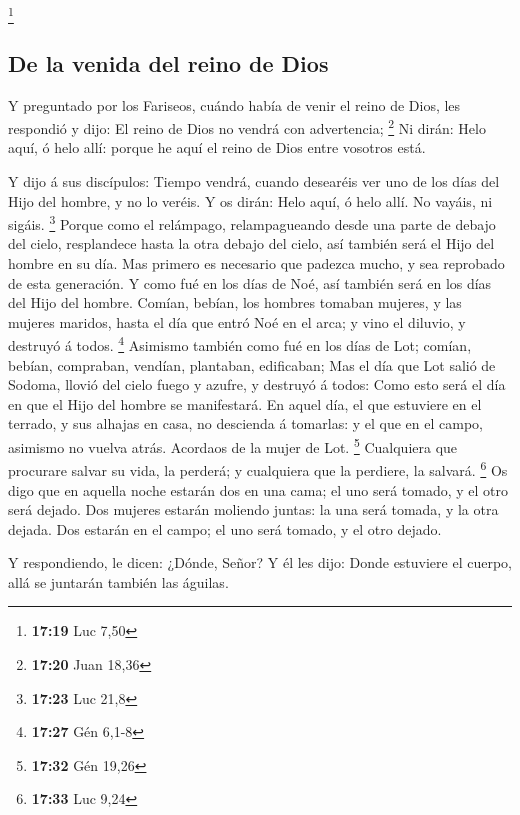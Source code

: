 \footnote{\textbf{17:19} Luc 7,50}

\hypertarget{de-la-venida-del-reino-de-dios}{%
\subsection{De la venida del reino de
Dios}\label{de-la-venida-del-reino-de-dios}}

 Y preguntado por los Fariseos, cuándo había de venir el
reino de Dios, les respondió y dijo: El reino de Dios no vendrá con
advertencia; \footnote{\textbf{17:20} Juan 18,36}  Ni
dirán: Helo aquí, ó helo allí: porque he aquí el reino de Dios entre
vosotros está.

 Y dijo á sus discípulos: Tiempo vendrá, cuando desearéis
ver uno de los días del Hijo del hombre, y no lo veréis. 
Y os dirán: Helo aquí, ó helo allí. No vayáis, ni sigáis. \footnote{\textbf{17:23}
  Luc 21,8}  Porque como el relámpago, relampagueando
desde una parte de debajo del cielo, resplandece hasta la otra debajo
del cielo, así también será el Hijo del hombre en su día.
 Mas primero es necesario que padezca mucho, y sea
reprobado de esta generación.  Y como fué en los días de
Noé, así también será en los días del Hijo del hombre. 
Comían, bebían, los hombres tomaban mujeres, y las mujeres maridos,
hasta el día que entró Noé en el arca; y vino el diluvio, y destruyó á
todos. \footnote{\textbf{17:27} Gén 6,1-8}  Asimismo
también como fué en los días de Lot; comían, bebían, compraban, vendían,
plantaban, edificaban;  Mas el día que Lot salió de
Sodoma, llovió del cielo fuego y azufre, y destruyó á todos:
 Como esto será el día en que el Hijo del hombre se
manifestará.  En aquel día, el que estuviere en el
terrado, y sus alhajas en casa, no descienda á tomarlas: y el que en el
campo, asimismo no vuelva atrás.  Acordaos de la mujer de
Lot. \footnote{\textbf{17:32} Gén 19,26}  Cualquiera que
procurare salvar su vida, la perderá; y cualquiera que la perdiere, la
salvará. \footnote{\textbf{17:33} Luc 9,24}  Os digo que
en aquella noche estarán dos en una cama; el uno será tomado, y el otro
será dejado.  Dos mujeres estarán moliendo juntas: la una
será tomada, y la otra dejada.  Dos estarán en el campo;
el uno será tomado, y el otro dejado.

 Y respondiendo, le dicen: ¿Dónde, Señor? Y él les dijo:
Donde estuviere el cuerpo, allá se juntarán también las águilas.

